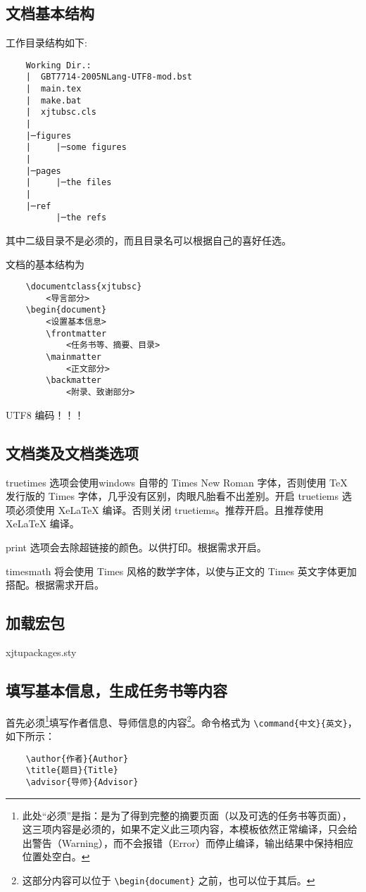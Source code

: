 \documentclass[%
               print, 
              ]{xjtubsc}
\begin{document}
\subsection{文档基本结构}
工作目录结构如下:
\begin{verbatim}
    Working Dir.:
    |  GBT7714-2005NLang-UTF8-mod.bst
    |  main.tex
    |  make.bat
    |  xjtubsc.cls
    |
    |─figures
    |     |─some figures
    |
    |─pages
    |     |─the files
    |
    |─ref
          |─the refs
\end{verbatim}
其中二级目录不是必须的，而且目录名可以根据自己的喜好任选。

文档的基本结构为
\begin{verbatim}
    \documentclass{xjtubsc}
        <导言部分>
    \begin{document}
        <设置基本信息>
        \frontmatter  
            <任务书等、摘要、目录>
        \mainmatter
            <正文部分>
        \backmatter
            <附录、致谢部分>
\end{verbatim}

UTF8 编码！！！
\subsection{文档类及文档类选项}

truetimes 选项会使用windows 自带的 Times New Roman 字体，否则使用 TeX 发行版的 Times 字体，几乎没有区别，肉眼凡胎看不出差别。开启 truetiems 选项必须使用 XeLaTeX 编译。否则关闭 truetiems。推荐开启。且推荐使用 XeLaTeX 编译。

print 选项会去除超链接的颜色。以供打印。根据需求开启。

timesmath 将会使用 Times 风格的数学字体，以使与正文的 Times 英文字体更加搭配。根据需求开启。

\subsection{加载宏包}
xjtupackages.sty

\subsection{填写基本信息，生成任务书等内容}

首先必须\footnote{此处“必须”是指：是为了得到完整的摘要页面（以及可选的任务书等页面），这三项内容是必须的，如果不定义此三项内容，本模板依然正常编译，只会给出警告（Warning），而不会报错（Error）而停止编译，输出结果中保持相应位置处空白。}填写作者信息、导师信息的内容\footnote{这部分内容可以位于 \verb+\begin{document}+ 之前，也可以位于其后。}。命令格式为 \verb|\command{中文}{英文}|，如下所示：
\begin{verbatim}
    \author{作者}{Author}
    \title{题目}{Title}
    \advisor{导师}{Advisor}
\end{verbatim}
\end{document}
